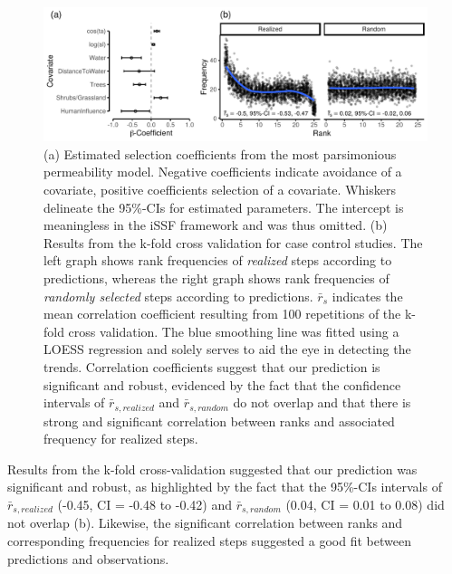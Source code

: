 \documentclass[abstract=on,10pt,a4paper,bibliography=totocnumbered]{scrartcl}
\begin{document}
\begin{figure}[h]
  \begin{center}
    \includegraphics[width = \textwidth]{99_PermeabilityResults.pdf}
    \caption{(a) Estimated selection coefficients from the most parsimonious
    permeability model. Negative coefficients indicate avoidance of a covariate,
    positive coefficients selection of a covariate. Whiskers delineate the
    95\%-CIs for estimated parameters. The intercept is meaningless in the iSSF
    framework and was thus omitted. (b) Results from the k-fold cross validation
    for case control studies. The left graph shows rank frequencies of
    \textit{realized} steps according to predictions, whereas the right graph
    shows rank frequencies of \textit{randomly selected} steps according to
    predictions. \(\bar{r}_s\) indicates the mean correlation coefficient
    resulting from 100 repetitions of the k-fold cross validation. The blue
    smoothing line was fitted using a LOESS regression and solely serves to aid
    the eye in detecting the trends. Correlation coefficients suggest that our
    prediction is significant and robust, evidenced by the fact that the
    confidence intervals of \(\bar{r}_{s, realized}\) and \(\bar{r}_{s,
    random}\) do not overlap and that there is strong and significant
    correlation between ranks and associated frequency for realized steps.}
    \label{PermeabilityResults}
  \end{center}
\end{figure}

\newpage
\noindent Results from the k-fold cross-validation suggested that our prediction
was significant and robust, as highlighted by the fact that the 95\%-CIs
intervals of \(\bar{r}_{s, realized}\) (-0.45, CI = -0.48 to -0.42) and
\(\bar{r}_{s, random}\) (0.04, CI = 0.01 to 0.08) did not overlap
(b). Likewise, the significant correlation between
ranks and corresponding frequencies for realized steps suggested a good fit
between predictions and observations.
\end{document}

